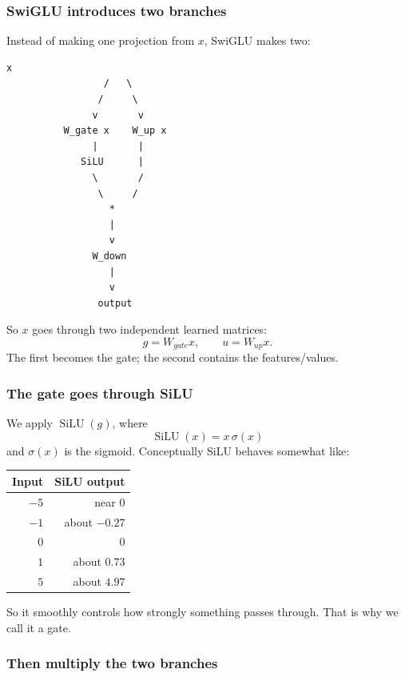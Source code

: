 \subsubsection{SwiGLU introduces two branches}

Instead of making one projection from \(x\), SwiGLU makes two:
\begin{lstlisting}[style=shadedpython,language={},basicstyle=\scriptsize\ttfamily]
                   x
                 /   \
                /     \
               v       v
          W_gate x    W_up x
               |       |
             SiLU      |
               \       /
                \     /
                  *
                  |
                  v
               W_down
                  |
                  v
                output
\end{lstlisting}
So \(x\) goes through two independent learned matrices:
\[
  g=W_{gate}x,\qquad u=W_{up}x.
\]
The first becomes the gate; the second contains the features/values.

\subsubsection{The gate goes through SiLU}

We apply \(\operatorname{SiLU}(g)\), where
\[
  \operatorname{SiLU}(x)=x\,\sigma(x)
\]
and \(\sigma(x)\) is the sigmoid. Conceptually SiLU behaves somewhat like:
\begin{center}
  \renewcommand{\arraystretch}{1.15}
  \small
  \begin{tabular}{@{}r r@{}}
    \textbf{Input} & \textbf{SiLU output} \\
    \hline
    \(-5\) & near \(0\) \\
    \(-1\) & about \(-0.27\) \\
    \(0\) & \(0\) \\
    \(1\) & about \(0.73\) \\
    \(5\) & about \(4.97\)
  \end{tabular}
\end{center}
So it smoothly controls how strongly something passes through. That is why we
call it a gate.

\subsubsection{Then multiply the two branches}

